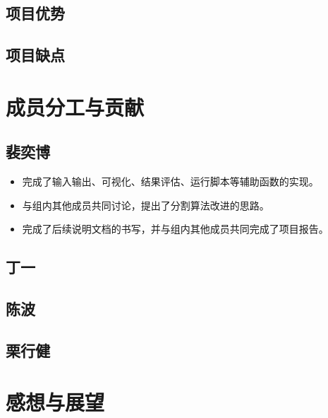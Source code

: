 \documentclass[UTF8]{ctexart}
\begin{document}
\subsection{项目优势}
\subsection{项目缺点}

\section{成员分工与贡献}
\subsection{裴奕博}
\begin{itemize}
    \item 完成了输入输出、可视化、结果评估、运行脚本等辅助函数的实现。
    \item 与组内其他成员共同讨论，提出了分割算法改进的思路。
    \item 完成了后续说明文档的书写，并与组内其他成员共同完成了项目报告。
\end{itemize}
\subsection{丁一}
\subsection{陈波}
\subsection{栗行健}

\section{感想与展望}
\end{document}
